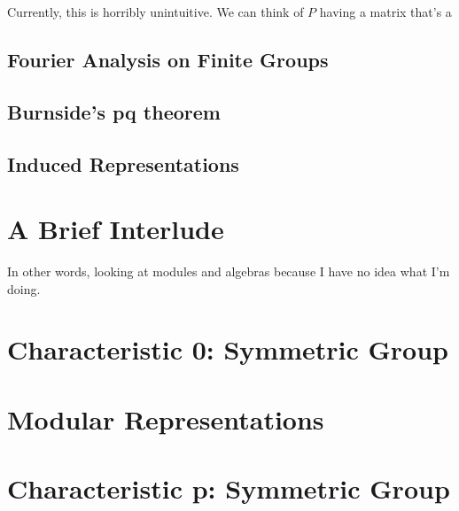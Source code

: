 \documentclass{article}
\begin{document}
\begin{note}
Currently, this is horribly unintuitive. We can think of $P$ having a matrix that's a 
\end{note}

\subsection{Fourier Analysis on Finite Groups}

\subsection{Burnside's pq theorem}

\subsection{Induced Representations}

\section{A Brief Interlude}
In other words, looking at modules and algebras because I have no idea what I'm doing.

\section{Characteristic 0: Symmetric Group}


\section{Modular Representations}

\section{Characteristic p: Symmetric Group}
\end{document}

